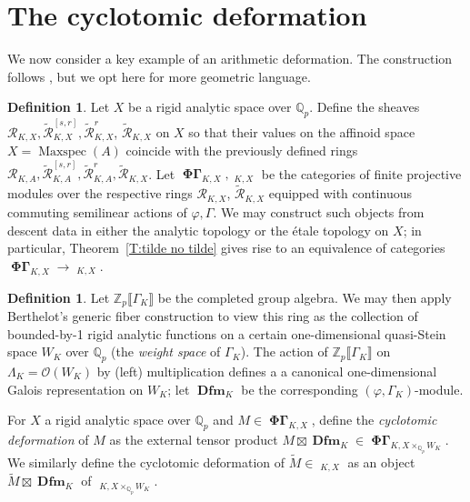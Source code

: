 \documentclass[12pt]{amsart}
\theoremstyle{definition}
\newtheorem{defn}[theorem]{Definition}
\numberwithin{equation}{theorem}
\newcommand{\Qp}{\mathbb{Q}_p}
\newcommand{\QQ}{\mathbb{Q}}
\newcommand{\ZZ}{\mathbb{Z}}
\newcommand{\calO}{\mathcal{O}}
\newcommand{\calR}{\mathcal{R}}
\DeclareMathOperator{\Dfm}{\mathbf{Dfm}}
\DeclareMathOperator{\Maxspec}{Maxspec}
\DeclareMathOperator{\PhiGamma}{\mathbf{\Phi \Gamma}}
\DeclareMathOperator{\PhiGammatilde}{\widetilde{\mathbf{\Phi \Gamma}}}
\begin{document}
\section{The cyclotomic deformation}

We now consider a key example of an arithmetic deformation. The construction follows
\cite[Definition~4.4.7]{kpx}, but we opt here for  more geometric language.

\begin{defn}
Let $X$ be a rigid analytic space over $\QQ_p$. 
Define the sheaves $\calR_{K,X}, \tilde{\calR}^{[s,r]}_{K,X}, \tilde{\calR}^{r}_{K,X}$,
$\tilde{\calR}_{K,X}$ on $X$ so that their values on the affinoid space $X = \Maxspec(A)$
coincide with the previously defined rings $\calR_{K,A}, \tilde{\calR}^{[s,r]}_{K,A}, \tilde{\calR}^{r}_{K,A}, \tilde{\calR}_{K,X}$.
Let $\PhiGamma_{K,X}, \PhiGammatilde_{K,X}$ be the categories of finite projective
modules over the respective rings $\calR_{K,X}$, $\tilde{\calR}_{K,X}$ equipped with continuous commuting semilinear actions of $\varphi, \Gamma$. 
We may construct such objects from descent data in either the analytic topology or the \'etale topology on $X$; in particular, Theorem~\ref{T:tilde no tilde} gives rise to an equivalence of categories $\PhiGamma_{K,X} \to \PhiGammatilde_{K,X}$.
\end{defn}

\begin{defn}
Let $\ZZ_p \llbracket \Gamma_K \rrbracket$ be the completed group algebra. We may then apply Berthelot's generic fiber construction to view this ring as the collection of bounded-by-1 rigid analytic functions on a certain one-dimensional quasi-Stein space $W_K$ over $\QQ_p$ (the \emph{weight space} of $\Gamma_K$).
The action of $\ZZ_p \llbracket \Gamma_K \rrbracket$ on $\Lambda_K = \calO(W_K)$ by (left) multiplication
defines a a canonical one-dimensional Galois representation on $W_K$; let $\Dfm_{K}$ be the corresponding $(\varphi, \Gamma_K)$-module.

For $X$ a rigid analytic space over $\QQ_p$ and $M \in \PhiGamma_{K,X}$,
define the \emph{cyclotomic deformation} of $M$
as the external tensor product $M \boxtimes \Dfm_{K} \in \PhiGamma_{K,X \times_{\Qp} W_K}$. We similarly define the cyclotomic deformation of $\tilde{M} \in \PhiGammatilde_{K,X}$ as an object $\tilde{M} \boxtimes \Dfm_{K}$ of $\PhiGammatilde_{K,X \times_{\Qp} W_K}$.
\end{defn}
\end{document}
